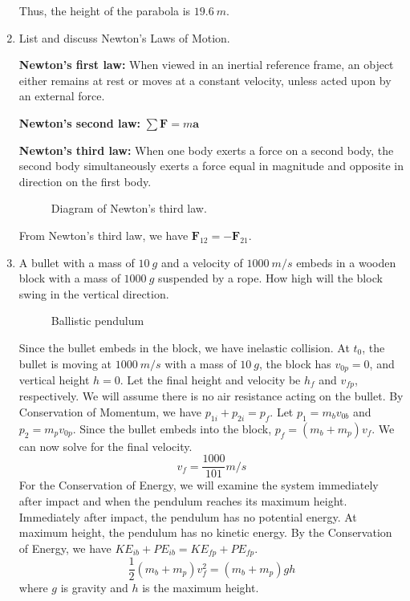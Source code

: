 \begin{enumerate}
\[  \]
  Thus, the height of the parabola is \(19.6 \ m\).
\item
  List and discuss Newton's Laws of Motion.
  \par\smallskip
  \textbf{Newton's first law:} When viewed in an inertial reference frame, an
  object either remains at rest or moves at a constant velocity, unless acted
  upon by an external force.
  \par\smallskip
  \textbf{Newton's second law:} \(\sum\mathbf{F} = m\mathbf{a}\)
  \par\smallskip
  \textbf{Newton's third law:} When one body exerts a force on a second body,
  the second body simultaneously exerts a force equal in magnitude and opposite
  in direction on the first body.
  \begin{figure}[H]
    \centering
    
    \caption{Diagram of Newton's third law.}
  \end{figure}
  From Newton's third law, we have \(\mathbf{F}_{12} = -\mathbf{F}_{21}\).
\item
  A bullet with a mass of \(10 \ g\) and a velocity of \(1000 \ m/s\) embeds
  in a wooden block with a mass of \(1000 \ g\) suspended by a rope.
  How high will the block swing in the vertical direction.
  \begin{figure}[H]
    \centering
    
    \caption{Ballistic pendulum}
  \end{figure}
  Since the bullet embeds in the block, we have inelastic collision.
  At \(t_0\), the bullet is moving at \(1000 \ m/s\) with a mass of \(10 \ g\),
  the block has \(v_{0p} = 0\), and vertical height \(h = 0\).
  Let the final height and velocity be \(h_f\) and \(v_{fp}\), respectively.
  We will assume there is no air resistance acting on the bullet.
  By Conservation of Momentum, we have \(p_{1i} + p_{2i} = p_f\).
  Let \(p_1 = m_bv_{0b}\) and \(p_2 = m_pv_{0p}\).
  Since the bullet embeds into the block, \(p_f = (m_b + m_p)v_f\).
  We can now solve for the final velocity.
  \[
  v_f = \frac{1000}{101} m/s
  \]
  For the Conservation of Energy, we will examine the system immediately after
  impact and when the pendulum reaches its maximum height.
  Immediately after impact, the pendulum has no potential energy.
  At maximum height, the pendulum has no kinetic energy.
  By the Conservation of Energy, we have
  \(KE_{ib} + PE_{ib} = KE_{fp} + PE_{fp}\).
  \[
  \frac{1}{2}(m_b + m_p)v_f^2 = (m_b + m_p)gh
  \]
  where \(g\) is gravity and \(h\) is the maximum height.

\end{enumerate}
